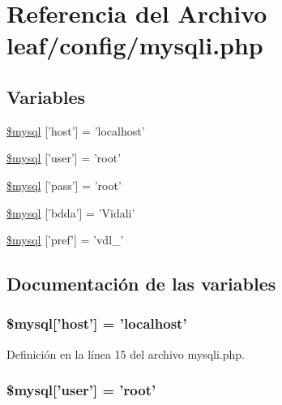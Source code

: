 \hypertarget{mysqli_8php}{\section{Referencia del Archivo leaf/config/mysqli.php}
\label{mysqli_8php}
}
\subsection*{Variables}
\begin{DoxyCompactItemize}
\item 
\hyperlink{mysqli_8php_afb4eac0a59446388a3fd59da8bbad466}{\$mysql} \mbox{[}'host'\mbox{]} = 'localhost'
\item 
\hyperlink{mysqli_8php_acb51a6cbb3dc7b1ed799347ba609b79b}{\$mysql} \mbox{[}'user'\mbox{]} = 'root'
\item 
\hyperlink{mysqli_8php_a29834c14ccc128006f5f4ff30417762a}{\$mysql} \mbox{[}'pass'\mbox{]} = 'root'
\item 
\hyperlink{mysqli_8php_ad8cf4b12c73eaf96b253c794a223a506}{\$mysql} \mbox{[}'bdda'\mbox{]} = 'Vidali'
\item 
\hyperlink{mysqli_8php_a289b7ce8a1af0f5281112b43967b5e67}{\$mysql} \mbox{[}'pref'\mbox{]} = 'vdl\-\_\-'
\end{DoxyCompactItemize}


\subsection{Documentación de las variables}
\hypertarget{mysqli_8php_afb4eac0a59446388a3fd59da8bbad466}{
\subsubsection[{\$mysql}]{\setlength{\rightskip}{0pt plus 5cm}\${\bf mysql}\mbox{[}'host'\mbox{]} = 'localhost'}}\label{mysqli_8php_afb4eac0a59446388a3fd59da8bbad466}


Definición en la línea 15 del archivo mysqli.\-php.

\hypertarget{mysqli_8php_acb51a6cbb3dc7b1ed799347ba609b79b}{
\subsubsection[{\$mysql}]{\setlength{\rightskip}{0pt plus 5cm}\${\bf mysql}\mbox{[}'user'\mbox{]} = 'root'}}\label{mysqli_8php_acb51a6cbb3dc7b1ed799347ba609b79b}


